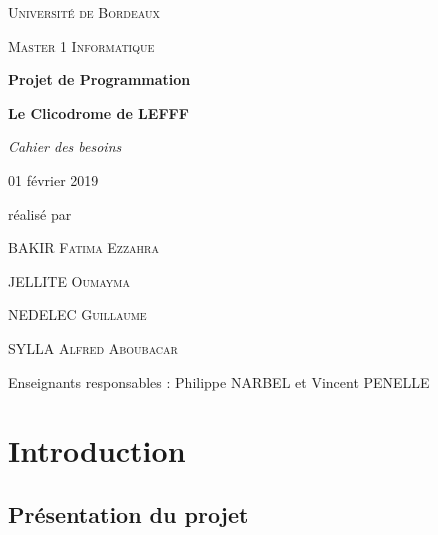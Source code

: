 \documentclass[12pt,a4paper]{article}
\begin{document}
\begin{titlepage}
\centering
{\scshape\LARGE Université de Bordeaux \par}
{\scshape\Large Master 1 Informatique  \par}
\vspace{3cm}

{\Huge\bfseries Projet de Programmation\par}
{\Huge\bfseries Le Clicodrome de LEFFF \par}
\vspace{0.5cm}
{\Large\itshape Cahier des besoins\par}
{\large 01 février 2019\par}

\vfill
réalisé par \par
BAKIR \textsc{Fatima Ezzahra} \par
JELLITE \textsc{Oumayma} \par
NEDELEC \textsc{Guillaume} \par
SYLLA  \textsc{Alfred Aboubacar} \par
\vfill

{\large Enseignants responsables : Philippe NARBEL et Vincent PENELLE\par}

\end{titlepage}

\section{Introduction}

\subsection{Présentation du projet}
\end{document}
